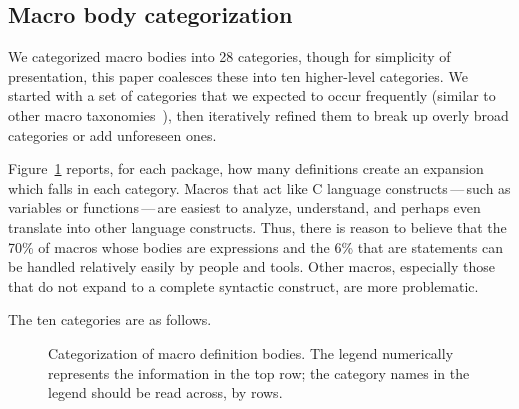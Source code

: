 \documentclass[10pt]{article}
\newcommand{\captionsmall}[1]{\caption[]{\small #1}}
\begin{document}
\subsection{Macro body categorization}

We categorized macro bodies into 28 categories, though for simplicity of
presentation, this paper coalesces these into ten higher-level categories.
We started with a set of categories that we expected to occur frequently
(similar to other macro
taxonomies~\cite{Stroustrup-DesignEvolution,Carroll95}), then iteratively
refined them to break up overly broad categories or add unforeseen ones.

Figure~\ref{fig:categorization} reports, for each package, how many
definitions create an expansion which falls in each category.  Macros that
act like C language constructs\,---\,such as variables or
functions\,---\,are easiest to analyze, understand, and perhaps even
translate into other language constructs.  Thus, there is reason to believe
that the 70\% of macros whose bodies are expressions and the 6\% that are
statements can be handled relatively easily by people and tools.  Other
macros, especially those that do not expand to a complete syntactic
construct, are more problematic.


The ten categories are as follows.  



\begin{figure}
\centerline{}
\captionsmall{Categorization of macro definition bodies.  The legend numerically
  represents the information in the top row; the category names in the
  legend should be read across, by rows.}
\label{fig:categorization}
\end{figure}



\label{sec:categorization-details}
\end{document}
